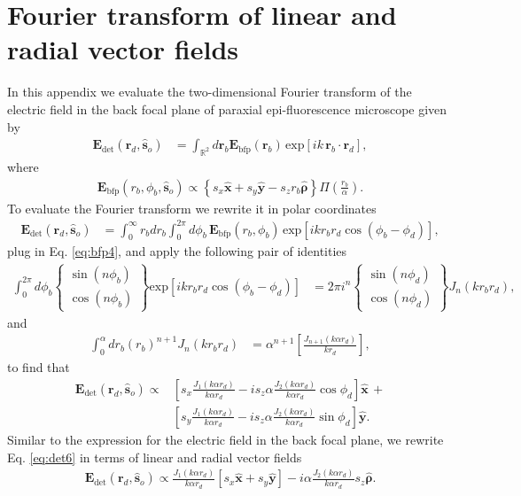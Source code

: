\documentclass[]{osa-article}
\providecommand{\mb}[1]{\mathbf{#1}}
\providecommand{\so}{\mathbf{\hat{s}}_o}
\providecommand{\rb}{\mathbf{r}_b}
\providecommand{\rd}{\mathbf{r}_d}
\providecommand{\mh}[1]{\mathbf{\hat{#1}}}
\providecommand{\mbb}[1]{\mathbb{#1}}
\providecommand{\bs}[1]{\boldsymbol{#1}}
\begin{document}
\section{Fourier transform of linear and radial vector fields}\label{sec:ftvec}
In this appendix we evaluate the two-dimensional Fourier transform of the
electric field in the back focal plane of paraxial epi-fluorescence microscope
given by
  \begin{align}
  \mb{E}_{\text{det}}(\rd{}, \so{}) &= \int_{\mbb{R}^2}d\rb{} \mb{E}_{\text{bfp}}(\rb{})\, \text{exp}\left[ik\,\rb{}\cdot\rd{}\right],\label{eq:det2}
  \end{align}
where
\begin{align}
  \mb{E}_{\text{bfp}}(r_b, \phi_b, \so{}) \propto \left\{s_x\mh{x} + s_y\mh{y} - s_z r_b \mh{\bs{\rho}}\right\}\Pi\left(\frac{r_b}{\alpha}\right). \label{eq:bfp4}
\end{align}
To evaluate the Fourier transform we rewrite it in polar coordinates
\begin{align}
\mb{E}_{\text{det}}(\rd{}, \so{}) &= \int_{0}^{\infty}r_bdr_b\int_0^{2\pi} d\phi_b\, \mb{E}_{\text{bfp}}(r_b, \phi_b)\, \text{exp}\left[ikr_b r_d\cos(\phi_b - \phi_d)\right],
\end{align}
plug in Eq. \ref{eq:bfp4}, and apply the following pair of identities
\begin{align}
  \int_0^{2\pi}d\phi_b
  \left\{\substack{
    \sin(n\phi_b)\\
    \cos(n\phi_b)
  }\right\}
  \text{exp}\left[ikr_br_d\cos(\phi_b - \phi_d)\right] &= 2\pi i^n
  \left\{\substack{
    \sin(n\phi_d)\\
    \cos(n\phi_d)
  }\right\}J_n(k r_br_d),
\end{align}
and 
  \begin{align}
  \int_0^{\alpha} dr_b (r_b)^{n+1}J_{n}(kr_br_d) &= \alpha^{n+1}\left[\frac{J_{n+1}(k\alpha r_d)}{k r_d}\right],
  \end{align}
to find that
\begin{align}
  \mb{E}_{\text{det}}(\rd{}, \so{}) \propto &\left[s_x\frac{J_1(k\alpha r_d)}{k\alpha r_d} - is_z\alpha \frac{J_2(k\alpha r_d)}{k\alpha r_d}\cos\phi_d\right]\mh{x}\, + \nonumber \\& \left[s_y\frac{J_1(k\alpha r_d)}{k\alpha r_d} - i s_z\alpha \frac{J_2(k\alpha r_d)}{k\alpha r_d}\sin\phi_d\right]\mh{y}. \label{eq:det6}
\end{align}
Similar to the expression for the electric field in the back focal plane, we
rewrite Eq. \ref{eq:det6} in terms of linear and radial vector fields
\begin{align}
  \mb{E}_{\text{det}}(\rd{}, \so{}) \propto \frac{J_1(k\alpha r_d)}{k\alpha r_d}[s_x\mh{x} + s_y\mh{y}] - i\alpha\frac{J_2(k\alpha r_d)}{k\alpha r_d}s_z\mh{\bs{\rho}}.
\end{align}
\end{document}
